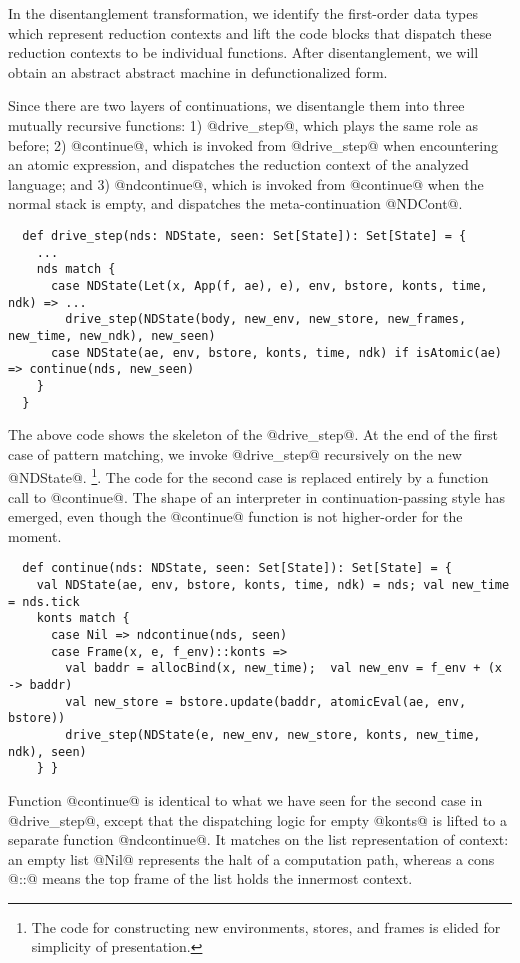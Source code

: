\documentclass[acmsmall, screen]{acmart}\settopmatter{}
\begin{document}
In the disentanglement transformation, we identify the first-order data types which represent
reduction contexts and lift the code blocks that dispatch these reduction contexts to be individual
functions.
After disentanglement, we will obtain an abstract abstract machine in defunctionalized form.

Since there are two layers of continuations, we disentangle them into three mutually recursive
functions:
1) @drive_step@, which plays the same role as before;
2) @continue@, which is invoked from @drive_step@ when encountering an atomic expression,
  and dispatches the reduction context of the analyzed language; and
3) @ndcontinue@, which is invoked from @continue@ when the normal stack is empty,
  and dispatches the meta-continuation @NDCont@.

\begin{lstlisting}
  def drive_step(nds: NDState, seen: Set[State]): Set[State] = {
    ...
    nds match {
      case NDState(Let(x, App(f, ae), e), env, bstore, konts, time, ndk) => ...
        drive_step(NDState(body, new_env, new_store, new_frames, new_time, new_ndk), new_seen)
      case NDState(ae, env, bstore, konts, time, ndk) if isAtomic(ae) => continue(nds, new_seen)
    }
  }
\end{lstlisting}

The above code shows the skeleton of the @drive_step@.
At the end of the first case of pattern matching, we invoke @drive_step@ recursively
on the new @NDState@.
\footnote{The code for constructing new environments, stores, and frames is elided for
simplicity of presentation.}.
The code for the second case is replaced entirely by a function call to @continue@.
The shape of an interpreter in continuation-passing style has emerged, even though
the @continue@ function is not higher-order for the moment.

\begin{lstlisting}
  def continue(nds: NDState, seen: Set[State]): Set[State] = {
    val NDState(ae, env, bstore, konts, time, ndk) = nds; val new_time = nds.tick
    konts match {
      case Nil => ndcontinue(nds, seen)
      case Frame(x, e, f_env)::konts =>
        val baddr = allocBind(x, new_time);  val new_env = f_env + (x -> baddr)
        val new_store = bstore.update(baddr, atomicEval(ae, env, bstore))
        drive_step(NDState(e, new_env, new_store, konts, new_time, ndk), seen)
    } }
\end{lstlisting}

Function @continue@ is identical to what we have seen for the second case in @drive_step@,
except that the dispatching logic for empty @konts@ is lifted to a separate function
@ndcontinue@.
It matches on the list representation of context: an empty list @Nil@ represents the
halt of a computation path, whereas a cons @::@ means the top frame of the list
holds the innermost context.
\end{document}
